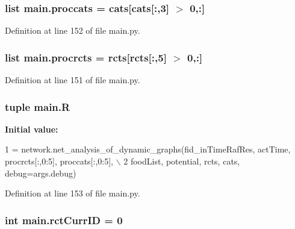 \hypertarget{a00153_a4e3c4b627d098aef6c7905cb20683e07}{
\subsubsection[{proccats}]{\setlength{\rightskip}{0pt plus 5cm}list main.\+proccats = {\bf cats}\mbox{[}{\bf cats}\mbox{[}\+:,3\mbox{]} $>$ 0,\+:\mbox{]}}}\label{a00153_a4e3c4b627d098aef6c7905cb20683e07}


Definition at line 152 of file main.\+py.

\hypertarget{a00153_a2120e8355b3501aed0114a74091d56c1}{
\subsubsection[{procrcts}]{\setlength{\rightskip}{0pt plus 5cm}list main.\+procrcts = {\bf rcts}\mbox{[}{\bf rcts}\mbox{[}\+:,5\mbox{]} $>$ 0,\+:\mbox{]}}}\label{a00153_a2120e8355b3501aed0114a74091d56c1}


Definition at line 151 of file main.\+py.

\hypertarget{a00153_a8a594014e054956af345eaa5e16bea0d}{
\subsubsection[{R}]{\setlength{\rightskip}{0pt plus 5cm}tuple main.\+R}}\label{a00153_a8a594014e054956af345eaa5e16bea0d}
{\bfseries Initial value\+:}
\begin{DoxyCode}
1 = network.net\_analysis\_of\_dynamic\_graphs(fid\_inTimeRafRes, actTime, procrcts[:,0:5], proccats[:,0:5], \(\backslash\)
2                                                                                                                                                 
         foodList, potential, rcts, cats, debug=args.debug)
\end{DoxyCode}


Definition at line 153 of file main.\+py.

\hypertarget{a00153_a53e397dea15f17442a198395e65b377b}{
\subsubsection[{rct\+Curr\+I\+D}]{\setlength{\rightskip}{0pt plus 5cm}int main.\+rct\+Curr\+I\+D = 0}}\label{a00153_a53e397dea15f17442a198395e65b377b}


